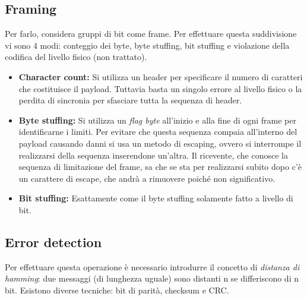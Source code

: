 \documentclass[10pt,a4paper,twoside]{article}
\begin{document}
\subsection{Framing}
 Per farlo, considera gruppi di bit come frame. Per effettuare questa suddivisione vi sono 4 modi: conteggio dei byte, byte stuffing, bit stuffing e violazione della codifica del livello fisico (non trattato).
\begin{itemize}
\item  \textbf{Character count:} Si utilizza un header per specificare il numero di caratteri che costituisce il payload. Tuttavia basta un singolo errore al livello fisico o la perdita di sincronia per sfasciare tutta la sequenza di header.
\item \textbf{Byte stuffing:} Si utilizza un \textit{flag byte} all'inizio e alla fine di ogni frame per identificarne i limiti. Per evitare che questa sequenza compaia all'interno del payload causando danni si usa un metodo di escaping, ovvero si interrompe il realizzarsi della sequenza inserendone un'altra. Il ricevente, che conosce la sequenza di limitazione del frame, sa che se sta per realizzarsi subito dopo c'è un carattere di escape, che andrà a rimuovere poiché non significativo.
\item \textbf{Bit stuffing:} Esattamente come il byte stuffing solamente fatto a livello di bit.
\end{itemize}

\subsection{Error detection}
Per effettuare questa operazione è necessario introdurre il concetto di \textit{distanza di hamming}: due messaggi (di lunghezza uguale) sono distanti n se differiscono di n bit. Esistono diverse tecniche: bit di parità, checksum e CRC.
\end{document}
